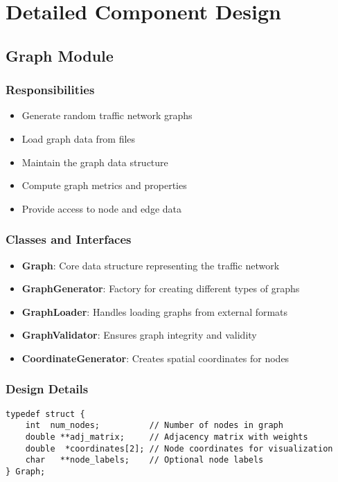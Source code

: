 \documentclass[conference]{IEEEtran}
\begin{document}
\section{Detailed Component Design}

\subsection{Graph Module}

\subsubsection{Responsibilities}
\begin{itemize}
    \item Generate random traffic network graphs
    \item Load graph data from files
    \item Maintain the graph data structure
    \item Compute graph metrics and properties
    \item Provide access to node and edge data
\end{itemize}

\subsubsection{Classes and Interfaces}
\begin{itemize}
    \item \textbf{Graph}: Core data structure representing the traffic network
    \item \textbf{GraphGenerator}: Factory for creating different types of graphs
    \item \textbf{GraphLoader}: Handles loading graphs from external formats
    \item \textbf{GraphValidator}: Ensures graph integrity and validity
    \item \textbf{CoordinateGenerator}: Creates spatial coordinates for nodes
\end{itemize}

\subsubsection{Design Details}
\begin{lstlisting}[caption=Graph Core Data Structure]
typedef struct {
    int  num_nodes;          // Number of nodes in graph
    double **adj_matrix;     // Adjacency matrix with weights
    double  *coordinates[2]; // Node coordinates for visualization
    char   **node_labels;    // Optional node labels
} Graph;
\end{lstlisting}
\end{document}
